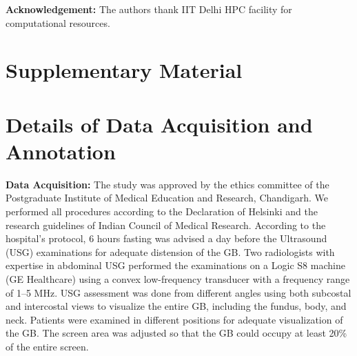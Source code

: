 \documentclass[10pt,twocolumn,letterpaper]{article}
\newcommand{\myfirstpara}[1]{\noindent \textbf{#1:}}
\newcommand{\mypara}[1]{\vspace{0.1em} \myfirstpara{#1}}
\newcommand{\beginsupplement}{\setcounter{table}{0}
        \renewcommand{\thetable}{S\arabic{table}}\setcounter{figure}{0}
        \renewcommand{\thefigure}{S\arabic{figure}}}
\begin{document}
{\small \mypara{Acknowledgement} The authors thank IIT Delhi HPC facility for computational resources.} 

\clearpage
{\small


}

\clearpage
\section*{Supplementary Material}

\maketitle

\appendix
\beginsupplement

\section{Details of Data Acquisition and Annotation}
\label{supp:data_collection}
\myfirstpara{Data Acquisition} The study was approved by the ethics committee of the Postgraduate Institute of Medical Education and Research, Chandigarh. We performed all procedures according to the Declaration of Helsinki and the research guidelines of Indian Council of Medical Research. According to the hospital's protocol, 6 hours fasting was advised a day before the Ultrasound (USG) examinations for adequate distension of the GB. Two radiologists with expertise in abdominal USG performed the examinations on a Logic S8 machine (GE Healthcare) using a convex low-frequency transducer with a frequency range of 1--5 MHz.  USG assessment was done from different angles using both subcostal and intercostal views to visualize the entire GB, including the fundus, body, and neck.  Patients were examined in different positions for adequate visualization of the GB.  The screen area was adjusted so that the GB could occupy at least 20\% of the entire screen.  
\end{document}
